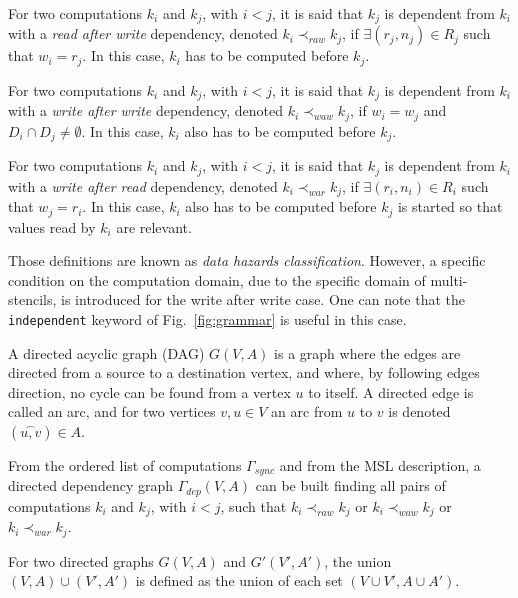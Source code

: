 \begin{mydef}
For two computations $k_i$ and $k_j$, with $i < j$, it is said that $k_j$ is dependent from $k_i$ with a \emph{read after write} dependency, denoted $k_i \prec_{raw} k_j$, if $\exists (r_j,n_j) \in R_j$ such that $w_i=r_j$. In this case, $k_i$ has to be computed before $k_j$.
\end{mydef}

\begin{mydef}
For two computations $k_i$ and $k_j$, with $i < j$, it is said that $k_j$ is dependent from $k_i$ with a \emph{write after write} dependency, denoted $k_i \prec_{waw} k_j$, if $w_i = w_j$ and $D_i \cap D_j \neq \emptyset$. In this case, $k_i$ also has to be computed before $k_j$.
\end{mydef}

\begin{mydef}
For two computations $k_i$ and $k_j$, with $i < j$, it is said that $k_j$ is dependent from $k_i$ with a \emph{write after read} dependency, denoted $k_i \prec_{war} k_j$, if $\exists (r_i,n_i) \in R_i$ such that $w_j=r_i$. In this case, $k_i$ also has to be computed before $k_j$ is started so that values read by $k_i$ are relevant.
\end{mydef}

Those definitions are known as \emph{data hazards classification}. However, a specific condition on the computation domain, due to the specific domain of multi-stencils, is introduced for the write after write case. One can note that the \texttt{independent} keyword of Fig.~\ref{fig:grammar} is useful in this case.

\begin{mydef}
A directed acyclic graph (DAG) $G(V,A)$ is a graph where the edges are directed from a source to a destination vertex, and where, by following edges direction, no cycle can be found from a vertex $u$ to itself. A directed edge is called an arc, and for two vertices $v,u \in V$ an arc from $u$ to $v$ is denoted $(\overset{\frown}{u,v}) \in A$.
\end{mydef}

From the ordered list of computations $\Gamma_{sync}$ and from the MSL description, a directed dependency graph $\Gamma_{dep}(V,A)$ can be built finding all pairs of computations $k_i$ and $k_j$, with $i<j$, such that $k_i \prec_{raw} k_j$ or $k_i \prec_{waw} k_j$ or $k_i \prec_{war} k_j$. 

\begin{mydef}
For two directed graphs $G(V,A)$ and $G'(V',A')$, the union $(V,A)\cup (V',A')$ is defined as the union of each set $(V\cup V', A \cup A')$.
\end{mydef}

